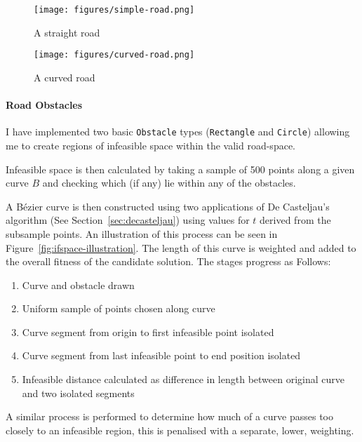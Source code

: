 \begin{figure}[ht]
  \centering
  \texttt{[image: figures/simple-road.png]}
  \caption{\label{fig:simple-road} A straight road}
\end{figure}

\begin{figure}[ht]
  \centering
  \texttt{[image: figures/curved-road.png]}
  \caption{\label{fig:curved-road} A curved road}
\end{figure}

\paragraph{Road Obstacles}

I have implemented two basic \texttt{Obstacle} types (\texttt{Rectangle} and \texttt{Circle}) allowing me to create regions of infeasible space within the valid road-space.

Infeasible space is then calculated by taking a sample of 500 points along a given curve $B$ and checking which (if any) lie within any of the obstacles.

A Bézier curve is then constructed using two applications of De Casteljau's algorithm (See Section~\ref{sec:decasteljau}) using values for $t$ derived from the subsample points. An illustration of this process can be seen in Figure~\ref{fig:ifspace-illustration}. The length of this curve is weighted and added to the overall fitness of the candidate solution. The stages progress as Follows:

\begin{enumerate}
  \item Curve and obstacle drawn
  \item Uniform sample of points chosen along curve
  \item Curve segment from origin to first infeasible point isolated
  \item Curve segment from last infeasible point to end position isolated
  \item Infeasible distance calculated as difference in length between original curve and two isolated segments
\end{enumerate}


A similar process is performed to determine how much of a curve passes too closely to an infeasible region, this is penalised with a separate, lower, weighting.

